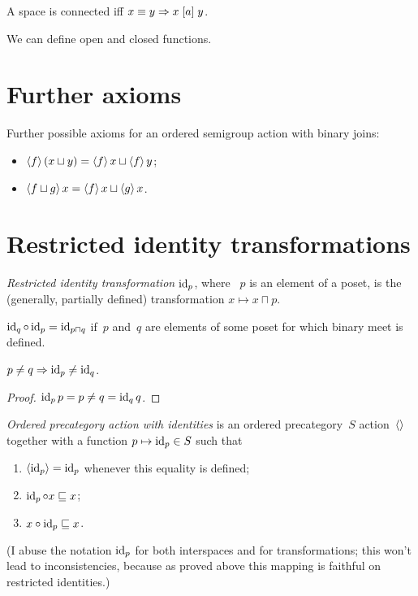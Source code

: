 A space is connected iff $x\equiv y\Rightarrow x\mathrel{\left[a\right]}y$.

We can define open and closed functions.

\chapter{Further axioms}

Further possible axioms for an ordered semigroup action with binary joins:

\begin{itemize}
\item $\left\langle f\right\rangle(x\sqcup y)=\left\langle f\right\rangle x\sqcup\left\langle f\right\rangle y$;
\item $\left\langle f\sqcup g\right\rangle x=\left\langle f\right\rangle x\sqcup\left\langle g\right\rangle x$.
\end{itemize}


\chapter{Restricted identity transformations}

\emph{Restricted identity transformation} $\operatorname{id}_p$, where ~$p$ is an element of a poset, is the (generally, partially defined) transformation $x\mapsto x\sqcap p$.

\begin{obvious}
$\operatorname{id}_q\circ\operatorname{id}_p = \operatorname{id}_{p\sqcap q}$ if~$p$ and~$q$ are elements of some poset for which binary meet is defined.
\end{obvious}

\begin{prop}
$p\ne q\Rightarrow\operatorname{id}_p\ne\operatorname{id}_q$.
\end{prop}

\begin{proof}
$\operatorname{id}_p p=p \ne q = \operatorname{id}_q q$.
\end{proof}

\emph{Ordered precategory action with identities} is an ordered precategory~$S$ action~$\left\langle \right\rangle$ together with a function $p\mapsto\operatorname{id}_p\in S$ such that
\begin{enumerate}
\item $\left\langle \operatorname{id}_p\right\rangle=\operatorname{id}_p$ whenever this equality is defined;
\item $\operatorname{id}_p\circ x\sqsubseteq x$;
\item $x\circ\operatorname{id}_p\sqsubseteq x$.
\end{enumerate}
(I abuse the notation $\operatorname{id}_p$ for both interspaces and for transformations; this won't lead to inconsistencies, because as proved above this mapping is faithful on restricted identities.)

